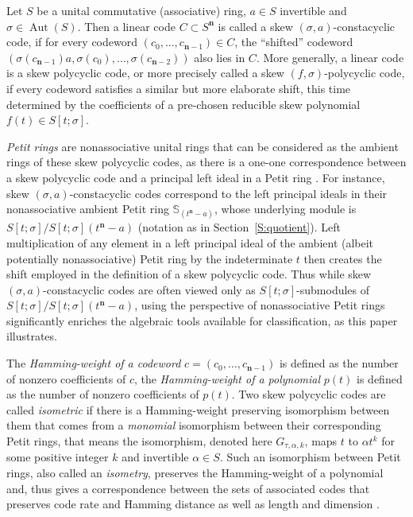 \documentclass[11pt]{amsart}
\theoremstyle{plain}
\theoremstyle{definition}
\numberwithin{equation}{section}
\numberwithin{figure}{section}
\newcommand{\Sone}[1]{\Stsigma/\Stsigma (t^{\de}-#1)} %
\newcommand{\ring}{S}
\newcommand{\Stsigma}{S[t;\sigma]}
\newcommand{\de}{\mathbf{n}}  %
\DeclareMathOperator{\Aut}{Aut}
\begin{document}
Let $\ring$ be a unital commutative (associative) ring, $a\in \ring$ invertible and $\sigma\in \Aut(S)$. Then a linear code $C\subset S^{\mathbf{n}}$ is called a skew  $(\sigma, a)$-constacyclic code, if for every  codeword $(c_0,\dots,c_{\mathbf{n}-1})\in  C$, the ``shifted'' codeword  $(\sigma(c_{\mathbf{n}-1})a,\sigma(c_0),\dots,\sigma(c_{\mathbf{n}-2}))$ also lies in $C$. More generally, a linear code is a skew polycyclic code, or more precisely called a  skew  $(f,\sigma)$-polycyclic code, if every codeword satisfies a similar but more elaborate shift, this time determined by the coefficients of a pre-chosen reducible skew polynomial $f(t)\in \Stsigma$.

\emph{Petit rings} are nonassociative unital rings that can be considered as the ambient rings of these skew polycyclic codes,  as there is a one-one correspondence between a skew polycyclic code and a principal left ideal in a Petit ring \cite{Pumpluen2017, Pumpluen2025}.
 For instance, skew $(\sigma, a)$-constacyclic codes  correspond to the left principal ideals in their nonassociative ambient Petit ring $\mathbb{S}_{(t^\de-a)}$, whose underlying module is $\Sone{a}$ (notation as in Section~\ref{S:quotient}).  Left multiplication of any element in a left principal ideal of the ambient (albeit potentially nonassociative) Petit ring  by the indeterminate $t$ then creates the shift employed in the definition of a skew polycyclic code.  Thus while skew $(\sigma, a)$-constacyclic codes are often viewed only as $\Stsigma$-submodules of $\Stsigma/\Stsigma (t^\de-a)$, using the perspective of  nonassociative Petit rings significantly enriches the algebraic tools available for classification, as this paper illustrates.



 The \emph{Hamming-weight of a codeword} $c=(c_0,\dots,c_{\mathbf{n}-1})$ is defined as the number of nonzero coefficients of $c$, the \emph{Hamming-weight of a polynomial} $p(t)$ is defined as the number of nonzero coefficients of $p(t)$.
Two skew polycyclic  codes %
are called \emph{isometric} if there is a Hamming-weight preserving isomorphism between them that comes from a \emph{monomial} isomorphism between their corresponding Petit rings, that means the isomorphism, denoted here $G_{\tau,\alpha,k}$, maps $t$ to $\alpha t^k$ for some positive integer $k$ and invertible $\alpha\in S$. 
  Such an isomorphism between Petit rings, also called an \emph{isometry}, preserves the Hamming-weight of a polynomial and,
thus gives a correspondence between the sets of associated codes that preserves code rate and Hamming distance as well as  length and dimension  \cite{Pumpluen2025}.
\end{document}
